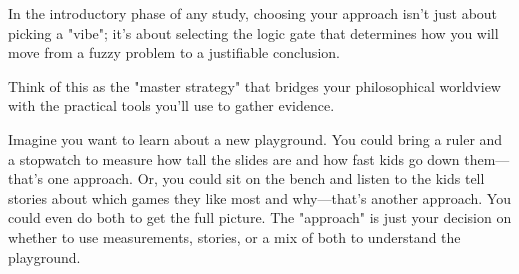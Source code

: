 \documentclass{report}
\begin{document}
In the introductory phase of any study, choosing your approach isn't just about picking a "vibe"; it's about selecting the logic gate that determines how you will move from a fuzzy problem to a justifiable conclusion.

Think of this as the "master strategy" that bridges your philosophical worldview with the practical tools you'll use to gather evidence.

\begin{layerELI5}
    Imagine you want to learn about a new playground. You could bring a ruler and a stopwatch to measure how tall the slides are and how fast kids go down them—that's one approach. Or, you could sit on the bench and listen to the kids tell stories about which games they like most and why—that's another approach. You could even do both to get the full picture. The "approach" is just your decision on whether to use measurements, stories, or a mix of both to understand the playground.
\end{layerELI5}
\end{document}
